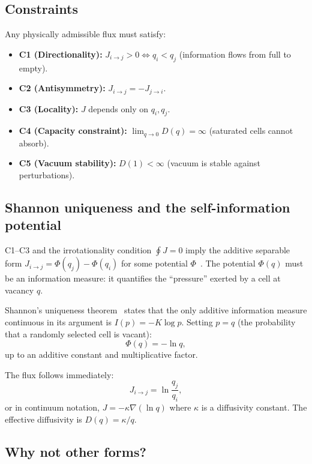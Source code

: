 \documentclass[reprint]{revtex4-2}
\begin{document}
\subsection{Constraints}

Any physically admissible flux must satisfy:
\begin{itemize}
\item \textbf{C1 (Directionality):} $J_{i\to j}>0 \iff q_i < q_j$ (information flows from full to empty).
\item \textbf{C2 (Antisymmetry):} $J_{i\to j} = -J_{j\to i}$.
\item \textbf{C3 (Locality):} $J$ depends only on $q_i,q_j$.
\item \textbf{C4 (Capacity constraint):} $\lim_{q\to 0}D(q)=\infty$ (saturated cells cannot absorb).
\item \textbf{C5 (Vacuum stability):} $D(1)<\infty$ (vacuum is stable against perturbations).
\end{itemize}

\subsection{Shannon uniqueness and the self-information potential}

C1--C3 and the irrotationality condition $\oint J=0$ imply the additive separable form $J_{i\to j} = \Phi(q_j)-\Phi(q_i)$ for some potential $\Phi$~\cite{flux_classification}. The potential $\Phi(q)$ must be an information measure: it quantifies the ``pressure'' exerted by a cell at vacancy $q$.

Shannon's uniqueness theorem~\cite{Shannon1948} states that the only additive information measure continuous in its argument is $I(p) = -K\log p$. Setting $p=q$ (the probability that a randomly selected cell is vacant):
\begin{equation}
\Phi(q) = -\ln q,
\end{equation}
up to an additive constant and multiplicative factor.

The flux follows immediately:
\begin{equation}
\boxed{J_{i\to j} = \ln\frac{q_j}{q_i}},
\end{equation}
or in continuum notation, $J = -\kappa\nabla(\ln q)$ where $\kappa$ is a diffusivity constant. The effective diffusivity is $D(q)=\kappa/q$.

\subsection{Why not other forms?}
\end{document}
